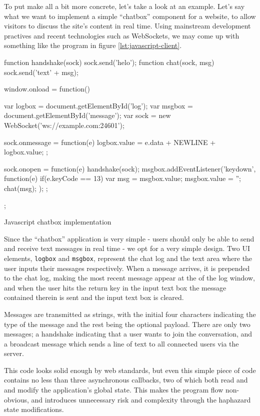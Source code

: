 \documentclass[preprint]{sigplanconf}
\begin{document}
To put make all a bit more concrete, let's take a look at an example. Let's say
what we want to implement a simple ``chatbox'' component for a website, to allow
visitors to discuss the site's content in real time. Using mainstream
development practives and recent technologies such as WebSockets, we may come
up with something like the program in figure \ref{lst:javascript-client}.

\begin{listingfloat}
\begin{code}
function handshake(sock) {sock.send('helo');}
function chat(sock, msg) {sock.send('text' + msg);}

window.onload = function() {
  var logbox = document.getElementById('log');
  var msgbox = document.getElementById('message');
  var sock = new WebSocket('ws://example.com:24601');

  sock.onmessage = function(e) {
    logbox.value = e.data + NEWLINE + logbox.value;
  };

  sock.onopen = function(e) {
    handshake(sock);
    msgbox.addEventListener('keydown', function(e) {
      if(e.keyCode == 13) {
        var msg = msgbox.value;
        msgbox.value = '';
        chat(msg);
      }
    });
  };
};
\end{code}
\caption{Javascript chatbox implementation}
\label{lst:javascript-client}
\end{listingfloat}

Since the ``chatbox'' application is very simple - users should only be able to
send and receive text messages in real time - we opt for a very simple
design. Two UI elements, \lstinline!logbox! and \lstinline!msgbox!, represent
the chat log and the text area where the user inputs their messages
respectively. When a message arrives, it is prepended to the chat log, making
the most recent message appear at the of the log window, and when the user hits
the return key in the input text box the message contained therein is sent and
the input text box is cleared.

Messages are transmitted as strings, with the initial four characters
indicating the type of the message and the rest being the optional payload.
There are only two messages; a handshake indicating that a user wants to join
the conversation, and a broadcast message which sends a line of text to all
connected users via the server.

This code looks solid enough by web standards, but even this simple piece of
code contains no less than three asynchronous callbacks, two of which both read
and and modify the application's global state. This makes the program flow
non-obvious, and introduces unnecessary risk and complexity through the
haphazard state modifications.
\end{document}
